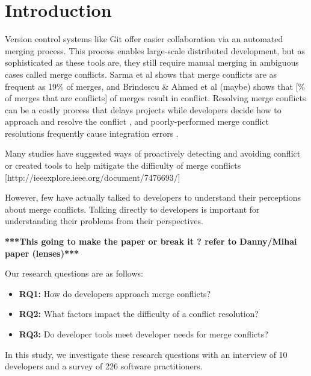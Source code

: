 \section{Introduction}\label{introduction}



Version control systems like Git offer easier collaboration via an automated merging process. This process enables large-scale distributed development, but as sophisticated as these tools are, they still require manual merging in ambiguous cases called merge conflicts. Sarma et al \cite{cassandra} shows that merge conflicts are as frequent as 19\% of merges, and Brindescu \& Ahmed et al (maybe) shows that [\% of merges that are conflicts] of merges result in conflict. Resolving merge conflicts can be a costly process that delays projects while developers decide how to approach and resolve the conflict \cite{cassandra}, and poorly-performed merge conflict resolutions frequently cause integration errors \cite{bird-branches-conflict}. 


Many studies have suggested ways of proactively detecting and avoiding conflict \cite{Brun2011} \cite{palantir} or created tools to help mitigate the difficulty of merge conflicts [http://ieeexplore.ieee.org/document/7476693/]


However, few have actually talked to developers to understand their perceptions about merge conflicts. Talking directly to developers is important for understanding their problems from their perspectives.

\textbf{***This going to make the paper or break it ? refer to Danny/Mihai paper (lenses)***}

Our research questions are as follows:
\begin{itemize}
\item\textbf{RQ1:} How do developers approach merge conflicts?\\
\item\textbf{RQ2:} What factors impact the difficulty of a conflict resolution?\\
\item\textbf{RQ3:} Do developer tools meet developer needs for merge conflicts?\\
\end{itemize}

In this study, we investigate these research questions with an interview of 10 developers and a survey of 226 software practitioners.